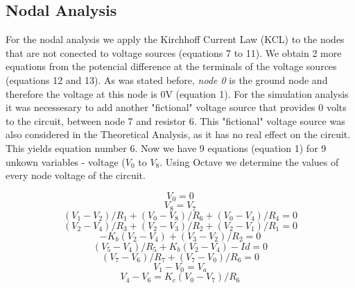\subsection{Nodal Analysis} 
For the nodal analysis we apply the Kirchhoff Current Law (KCL) to the nodes that are not conected to voltage sources (equations 7 to 11). We obtain 2 more equations from the potencial difference at the terminals of the voltage sources (equations 12 and 13). As was stated before, {\it node 0} is the ground node and therefore the voltage at this node is 0V (equation 1). For the simulation analysis it was necessesary to add another "fictional" voltage source that provides 0 volts to the circuit, between node 7 and resistor 6. This "fictional" voltage source was also considered in the Theoretical Analysis, as it has no real effect on the circuit. This yields equation number 6. Now we have 9 equations (equation 1) for 9 unkown variables - voltage ({\it$V_{0}$}  to {\it$V_{8}$}. Using Octave we determine the values of every node voltage of the circuit. \par


\begin {equation}
	V_0 = 0
	\label{eq:n1}
\end{equation}
\begin {equation}
	V_8 = V_7
	\label{eq:n2}
\end{equation}
\begin {equation}
	(V_1-V_2)/R_1 +(V_0 - V_8)/R_6 + (V_0 - V_4)/R_4 = 0
	\label{eq:n3}
\end{equation}
\begin {equation}
	(V_2-V_4)/R_3 + (V_2-V_3)/R_2 + (V_2-V_1)/R_1 = 0
	\label{eq:n4}
\end{equation}
\begin {equation}
	- K_b(V_2-V_4) + (V_3-V_2)/R_2 = 0
	\label{eq:n5}
\end{equation}
\begin {equation}
	(V_5-V_4)/R_5 + K_b(V_2-V_4) - Id = 0
	\label{eq:n6}
\end{equation}
\begin {equation}
	(V_7-V_6)/R_7 + (V_7 - V_0)/R_6 = 0
	\label{eq:n7}
\end{equation}
\begin {equation}
	V_1 - V_0 = V_a
	\label{eq:n8}
\end{equation}
\begin {equation}
	V_4 - V_6 = K_c  (V_0 - V_7)/R_6
	\label{eq:n9}
\end{equation}




